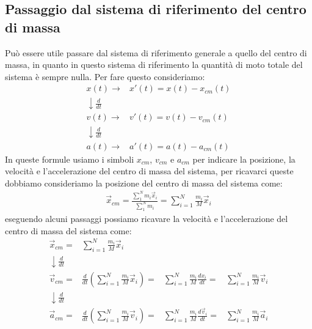     \subsection{Passaggio dal sistema di riferimento del centro di massa}
        Può essere utile passare dal sistema di riferimento generale a quello del centro di massa, in quanto in questo sistema di riferimento la quantità di moto totale del sistema è sempre nulla. Per fare questo consideriamo:
        \begin{align*}
            x(t) \rightarrow & x'(t) = x(t) - x_{cm}(t)\\
            \downarrow \frac{d}{dt} & \\
            v(t) \rightarrow & v'(t) = v(t) - v_{cm}(t)\\
            \downarrow \frac{d}{dt} & \\
            a(t) \rightarrow & a'(t) = a(t) - a_{cm}(t)
        \end{align*}
        In queste formule usiamo i simboli $x_{cm}$, $v_{cm}$ e $a_{cm}$ per indicare la posizione, la velocità e l'accelerazione del centro di massa del sistema, per ricavarci queste dobbiamo consideriamo la posizione del centro di massa del sistema come:
        \begin{align}
            \vec{x}_{cm} = \frac{\sum_{1}^{N} m_i \vec{x}_i}{\sum_{1}^{N} m_i} = \sum_{i=1}^{N} \frac{m_i}{M} \vec{x}_i \label{eq:posizioneCM}
        \end{align}
        eseguendo alcuni passaggi possiamo ricavare la velocità e l'accelerazione del centro di massa del sistema come:
        \begin{align*}
            \vec{x}_{cm} = & \sum_{i=1}^{N} \frac{m_i}{M} \vec{x}_i &&\\
            \downarrow \frac{d}{dt} & \\
            \vec{v}_{cm} = & \frac{d}{dt}\left(\sum_{i=1}^{N} \frac{m_i}{M} \vec{x}_i\right)
            =& \sum_{i=1}^{N} \frac{m_i}{M} \frac{dx_i}{dt}
            =& \sum_{i=1}^{N} \frac{m_i}{M} \vec{v}_i\\
            \downarrow \frac{d}{dt} & \\
            \vec{a}_{cm} = & \frac{d}{dt}\left(\sum_{i=1}^{N} \frac{m_i}{M} \vec{v}_i\right)
            =& \sum_{i=1}^{N} \frac{m_i}{M} \frac{d\vec{v}_i}{dt}
            =& \sum_{i=1}^{N} \frac{m_i}{M} \vec{a}_i
        \end{align*}
        

